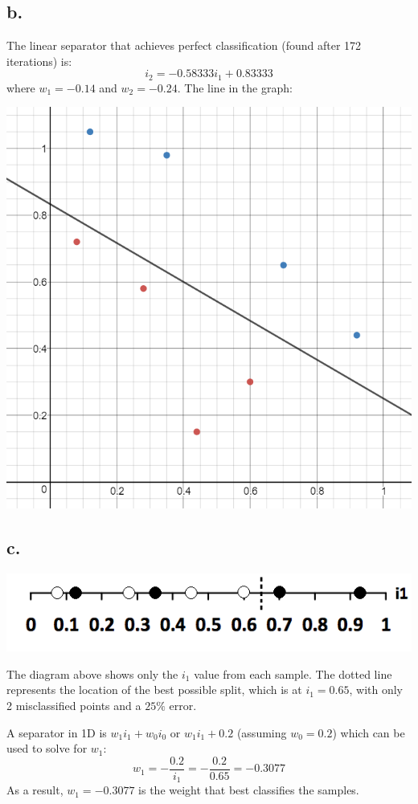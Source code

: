 \documentclass[12pt, letterpaper]{article}
\begin{document}
	\subsection{b.}
	The linear separator that achieves perfect classification (found after 172 iterations) is:
	$$i_2 = -0.58333i_1 + 0.83333$$
	where $w_1 = -0.14$ and $w_2 = -0.24$. The line in the graph:
	\medskip

	\includegraphics[scale=0.6]{"Problem 4/Best Line"}
	
	\medskip 
	
	
	\subsection{c.}
	\includegraphics[scale=1]{"Problem 4/1D Diagram"}	
	
	The diagram above shows only the $i_1$ value from each sample. The dotted line represents the location of the best possible split, which is at $i_1 = 0.65$, with only 2 misclassified points and a $25\%$ error. 
	
	A separator in 1D is $w_1i_1 + w_0i_0$ or $w_1i_1 + 0.2$ (assuming $w_0 = 0.2$) which can be used to solve for $w_1$:
	$$w_1 = -\frac{0.2}{i_1} = -\frac{0.2}{0.65} = -0.3077$$ 
	As a result, $w_1 = -0.3077$ is the weight that best classifies the samples.
	
\end{document}
